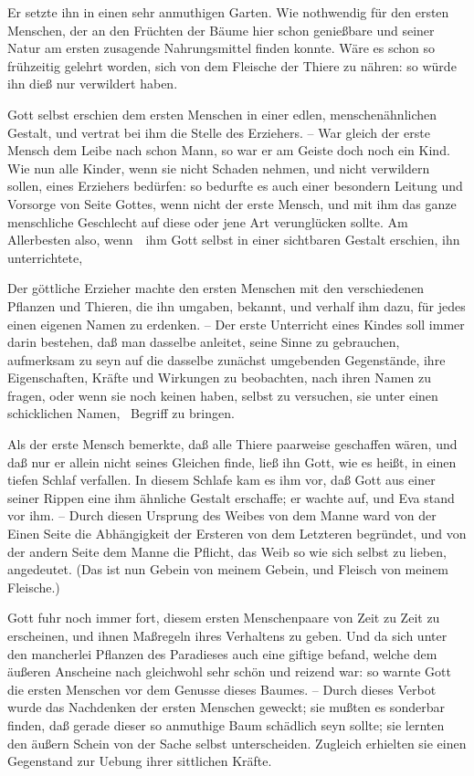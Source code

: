 \begin{RWanm}
\begin{aufza}
\item Er setzte ihn in einen sehr anmuthigen Garten. Wie nothwendig für den ersten Menschen, der an den Früchten der Bäume hier schon genießbare und seiner Natur am ersten zusagende Nahrungsmittel finden konnte. Wäre es schon so frühzeitig gelehrt worden, sich von dem Fleische der Thiere zu nähren: so würde ihn dieß nur verwildert haben.
\item Gott selbst erschien dem ersten Menschen in einer edlen, menschenähnlichen Gestalt, und vertrat bei ihm die Stelle des Erziehers. -- War gleich der erste Mensch dem Leibe nach schon Mann, so war er am Geiste doch noch ein Kind. Wie nun alle Kinder, wenn sie nicht Schaden nehmen, und nicht verwildern sollen, eines Erziehers bedürfen: so bedurfte es auch einer besondern Leitung und Vorsorge von Seite Gottes, wenn nicht der erste Mensch, und mit ihm das ganze menschliche Geschlecht auf diese oder jene Art verunglücken sollte. Am Allerbesten also, wenn~\ ihm Gott selbst in einer sichtbaren Gestalt erschien, ihn unterrichtete, \usw\
\item Der göttliche Erzieher machte den ersten Menschen mit den verschiedenen Pflanzen und Thieren, die ihn umgaben, bekannt, und verhalf ihm dazu, für jedes einen eigenen Namen zu erdenken. -- Der erste Unterricht eines Kindes soll immer darin bestehen, daß man dasselbe anleitet, seine Sinne zu gebrauchen, aufmerksam zu seyn auf die dasselbe zunächst umgebenden Gegenstände, ihre Eigenschaften, Kräfte und Wirkungen zu beobachten, nach ihren Namen zu fragen, oder wenn sie noch keinen haben, selbst zu versuchen, sie unter einen schicklichen Namen, \dh\ Begriff zu bringen.
\item Als der erste Mensch bemerkte, daß alle Thiere paarweise geschaffen wären, und daß nur er allein nicht seines Gleichen finde, ließ ihn Gott, wie es heißt, in einen tiefen Schlaf verfallen. In diesem Schlafe kam es ihm vor, daß Gott aus einer seiner Rippen eine ihm ähnliche Gestalt erschaffe; er wachte auf, und Eva stand vor ihm. -- Durch diesen Ursprung des Weibes von dem Manne ward von der Einen Seite die Abhängigkeit der Ersteren von dem Letzteren begründet, und von der andern Seite dem Manne die Pflicht, das Weib so wie sich selbst zu lieben, angedeutet. (Das ist nun Gebein von meinem Gebein, und Fleisch von meinem Fleische.)
\item Gott fuhr noch immer fort, diesem ersten Menschenpaare von Zeit zu Zeit zu erscheinen, und ihnen Maßregeln ihres Verhaltens zu geben. Und da sich unter den mancherlei Pflanzen des Paradieses auch eine giftige befand, welche dem äußeren Anscheine nach gleichwohl sehr schön und reizend war: so warnte Gott die ersten Menschen vor dem Genusse dieses Baumes. -- Durch dieses Verbot wurde das Nachdenken der ersten Menschen geweckt; sie mußten es sonderbar finden, daß gerade dieser so anmuthige Baum schädlich seyn sollte; sie lernten den äußern Schein von der Sache selbst unterscheiden. Zugleich erhielten sie einen Gegenstand zur Uebung ihrer sittlichen Kräfte.

\end{aufza}
\end{RWanm}
